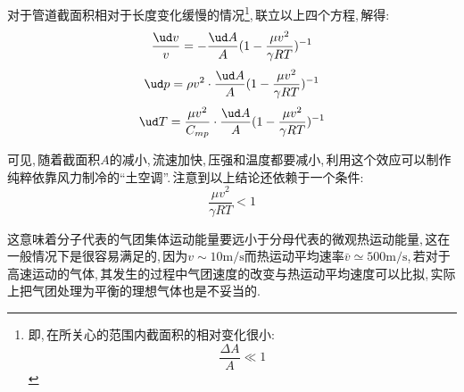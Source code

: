 对于管道截面积相对于长度变化缓慢的情况\footnote{即,\,在所关心的范围内截面积的相对变化很小:\[\frac{\Delta A}{A}\ll 1\]},\,联立以上四个方程,\,解得:
\[\frac{\ud v}{v}=-\frac{\ud A}{A}(1-\frac{\mu v^2}{\gamma RT})^{-1}\]
\[\ud p=\rho v^2\cdot\frac{\ud A}{A}(1-\frac{\mu v^2}{\gamma RT})^{-1}\]
\[\ud T=\frac{\mu v^2}{C_{mp}}\cdot\frac{\ud A}{A}(1-\frac{\mu v^2}{\gamma RT})^{-1}\]

可见,\,随着截面积$A$的减小,\,流速加快,\,压强和温度都要减小,\,利用这个效应可以制作纯粹依靠风力制冷的``土空调''.\,注意到以上结论还依赖于一个条件:
\[\frac{\mu v^2}{\gamma RT}<1\]

这意味着分子代表的气团集体运动能量要远小于分母代表的微观热运动能量,\,这在一般情况下是很容易满足的,\,因为$v\sim 10 \mathrm{m/s}$而热运动平均速率$\bar{v}\simeq 500 \mathrm{m/s}$,\,若对于高速运动的气体,\,其发生的过程中气团速度的改变与热运动平均速度可以比拟,\,实际上把气团处理为平衡的理想气体也是不妥当的.
